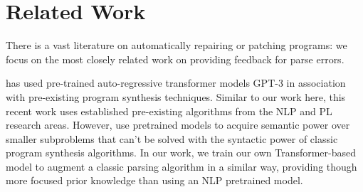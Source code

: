 \section{Related Work}
\label{sec:related-work}

There is a vast literature on automatically repairing or patching programs:
we focus on the most closely related work on providing feedback for parse
errors.


%
\citep{Rahmani2021, Verbruggen2021} has used pre-trained auto-regressive
transformer models \ie GPT-3 \citep{?} in association with pre-existing program
synthesis techniques. Similar to our work here, this recent work uses
established pre-existing algorithms from the NLP and PL research areas. However,
\citep{Rahmani2021, Verbruggen2021} use pretrained models to acquire semantic
power over smaller subproblems that can't be solved with the syntactic power of
classic program synthesis algorithms. In our work, we train our own
Transformer-based model to augment a classic parsing algorithm in a similar way,
providing though more focused prior knowledge than using an NLP pretrained
model.




